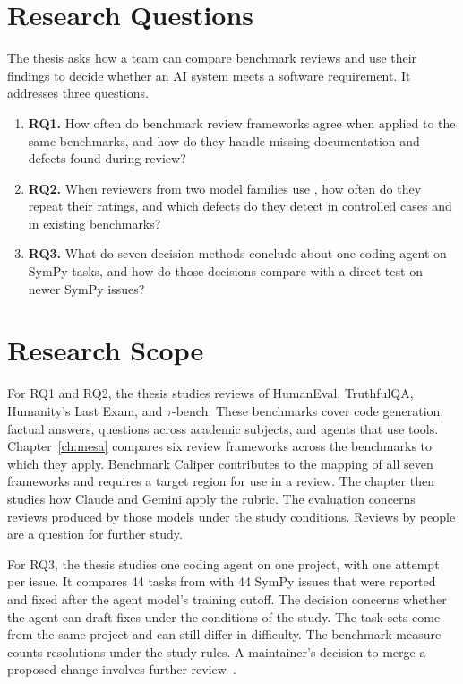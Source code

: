 \section{Research Questions}
\label{sec:intro_rqs}

The thesis asks how a team can compare benchmark reviews and use their findings to decide whether an AI system meets a software requirement. It addresses three questions.

\begin{enumerate}
    \item \textbf{RQ1.} How often do benchmark review frameworks agree when applied to the same benchmarks, and how do they handle missing documentation and defects found during review?
    \item \textbf{RQ2.} When reviewers from two model families use \mesa{}, how often do they repeat their ratings, and which defects do they detect in controlled cases and in existing benchmarks?
    \item \textbf{RQ3.} What do seven decision methods conclude about one coding agent on \swebench{} SymPy tasks, and how do those decisions compare with a direct test on newer SymPy issues?
\end{enumerate}

\section{Research Scope}
\label{sec:intro_scope}

For RQ1 and RQ2, the thesis studies reviews of HumanEval, TruthfulQA, Humanity's Last Exam, and $\tau$-bench. These benchmarks cover code generation, factual answers, questions across academic subjects, and agents that use tools. Chapter~\ref{ch:mesa} compares six review frameworks across the benchmarks to which they apply. Benchmark Caliper contributes to the mapping of all seven frameworks and requires a target region for use in a review. The chapter then studies how Claude and Gemini apply the \mesa{} rubric. The evaluation concerns reviews produced by those models under the study conditions. Reviews by people are a question for further study.

For RQ3, the thesis studies one coding agent on one project, with one attempt per issue. It compares 44 tasks from \swebench{} with 44 SymPy issues that were reported and fixed after the agent model's training cutoff. The decision concerns whether the agent can draft fixes under the conditions of the study. The task sets come from the same project and can still differ in difficulty. The benchmark measure counts resolutions under the study rules. A maintainer's decision to merge a proposed change involves further review~\cite{whitfill_metr_merge_2026}.

